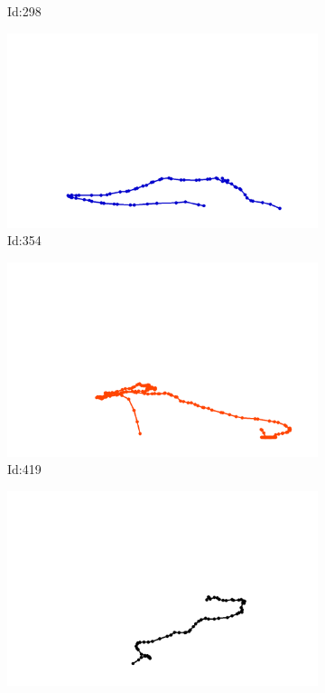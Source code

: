 \documentclass[12pt,twoside]{report}
\begin{document}
\begin{figure}
\begin{subfigure}[b]{0.20\textwidth}
\caption{Id:298}
\end{subfigure}
\begin{subfigure}[b]{0.20\textwidth}
\centering
\includegraphics[width=\textwidth]{../trajectories/354.png}
\caption{Id:354}
\end{subfigure}
\begin{subfigure}[b]{0.20\textwidth}
\centering
\includegraphics[width=\textwidth]{../trajectories/419.png}
\caption{Id:419}
\end{subfigure}
\begin{subfigure}[b]{0.20\textwidth}
\centering
\includegraphics[width=\textwidth]{../trajectories/497.png}

\end{subfigure}
\end{figure}
\end{document}
